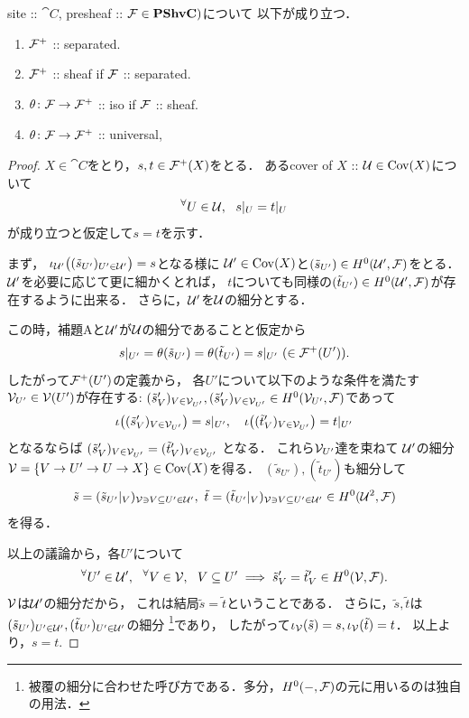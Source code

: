 \begin{Lemma}
    site :: $\cat{C}$, presheaf :: $\mathcal{F} \in \mathbf{PShv}\mathbf{C})$について
    以下が成り立つ．
    \begin{enumerate}[label=(\alph*)]
        \item $\mathcal{F}^+$ :: separated. 
        \item $\mathcal{F}^+$ :: sheaf if $\mathcal{F}$ :: separated.
        \item $\theta \colon \mathcal{F} \to \mathcal{F}^+$ :: iso if $\mathcal{F}$ :: sheaf.
        \item $\theta \colon \mathcal{F} \to \mathcal{F}^+$ :: universal,
    \end{enumerate}
\end{Lemma}
\begin{proof}
    $X \in \cat{C}$をとり，$s, t \in \mathcal{F}^+(X)$をとる．
    あるcover of $X$ :: $\mathcal{U} \in \operatorname{Cov}(X)$について
    \[ {}^{\forall} U \in \mathcal{U},~~ s|_{U}=t|_{U} \]
    が成り立つと仮定して$s=t$を示す．
 
    まず，
    $\iota_{\mathcal{U}'}\big( (\tilde{s}_{U'})_{U' \in \mathcal{U}'} \big)=s$となる様に
    $\mathcal{U}' \in \operatorname{Cov}(X)$と$(\tilde{s}_{U'}) \in H^0(\mathcal{U}', \mathcal{F})$をとる．
    $\mathcal{U}'$を必要に応じて更に細かくとれば，
    $t$についても同様の$(\tilde{t}_{U'}) \in H^0(\mathcal{U}', \mathcal{F})$が存在するように出来る．
    さらに，$\mathcal{U}'$を$\mathcal{U}$の細分とする．
    
    この時，補題Aと$\mathcal{U}'$が$\mathcal{U}$の細分であることと仮定から
    \[ s|_{U'}=\theta(\tilde{s}_{U'})=\theta(\tilde{t}_{U'})=s|_{U'} \ (\in \mathcal{F}^+(U')). \]
    したがって$\mathcal{F}^+(U')$の定義から，
    各$U'$について以下のような条件を満たす$\mathcal{V}_{U'} \in \mathcal{V}(U')$が存在する:
    $(\tilde{s}'_{V})_{V \in \mathcal{V}_{U'}},
        (\tilde{s}'_{V})_{V \in \mathcal{V}_{U'}} \in H^0(\mathcal{V}_{U'}, \mathcal{F})$であって
    \[
        \iota\big( (\tilde{s}'_{V})_{V \in \mathcal{V}_{U'}} \big)=s|_{U'},\quad
        \iota\big( (\tilde{t}'_{V})_{V \in \mathcal{V}_{U'}} \big)=t|_{U'}
    \]
    となるならば
    $(\tilde{s}'_{V})_{V \in \mathcal{V}_{U'}}=(\tilde{t}'_{V})_{V \in \mathcal{V}_{U'}}$
    となる．
    これら$\mathcal{V}_{U'}$達を束ねて
    $\mathcal{U}'$の細分$\mathcal{V}=\{V \to U' \to U \to X\} \in \operatorname{Cov}(X)$を得る．
    $(\tilde{s}_{U'}), (\tilde{t}_{U'})$も細分して
    \[
        \tilde{s}=(\tilde{s}_{U'}|_{V})_{\covV \ni V \subseteq U' \in \covU'},\ 
        \tilde{t}=(\tilde{t}_{U'}|_{V})_{\covV \ni V \subseteq U' \in \covU'}
        \in H^0(\covU^2, \shF)
    \]
    を得る．
    
    以上の議論から，各$U'$について
    \[
        {}^{\forall}  U' \in \mathcal{U}' ,~~ {}^{\forall}  V \in \mathcal{V} ,~~
        V \subseteq U' \implies
        \tilde{s}'_{V}=\tilde{t}'_{V} \in H^0(\mathcal{V}, \mathcal{F}).
    \]
    $\mathcal{V}$は$\mathcal{U}'$の細分だから，
    これは結局$\tilde{s}=\tilde{t}$ということである．
    さらに，$\tilde{s}, \tilde{t}$は
    $(\tilde{s}_{U'})_{U' \in \mathcal{U}'}, (\tilde{t}_{U'})_{U' \in \mathcal{U}'}$の細分
    \footnote{ 被覆の細分に合わせた呼び方である．多分，$H^0(-, \mathcal{F})$の元に用いるのは独自の用法． }であり，
    したがって$\iota_{\mathcal{V}}(\tilde{s})=s, \iota_{\mathcal{V}}(\tilde{t})=t$．
    以上より，$s=t$.


\end{proof}
